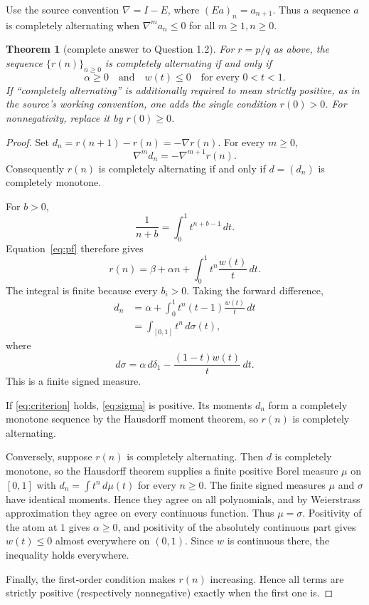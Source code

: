 \documentclass[10pt]{article}
\newtheorem{theorem}{Theorem}
\begin{document}
Use the source convention $\nabla=I-E$, where $(Ea)_n=a_{n+1}$.  Thus a
sequence $a$ is completely alternating when $\nabla^m a_n\leq0$ for all
$m\geq1,n\geq0$.

\begin{theorem}[complete answer to Question 1.2]\label{thm:main}
For $r=p/q$ as above, the sequence $\{r(n)\}_{n\geq0}$ is completely
alternating if and only if
\begin{equation}\label{eq:criterion}
                    \alpha\geq0
                    \quad\text{and}\quad
                    w(t)\leq0\quad\text{for every }0<t<1.
\end{equation}
If ``completely alternating'' is additionally required to mean strictly
positive, as in the source's working convention, one adds the single condition
$r(0)>0$.  For nonnegativity, replace it by $r(0)\geq0$.
\end{theorem}

\begin{proof}
Set $d_n=r(n+1)-r(n)=-\nabla r(n)$.  For every $m\geq0$,
\[
                         \nabla^m d_n=-\nabla^{m+1}r(n).
\]
Consequently $r(n)$ is completely alternating if and only if $d=(d_n)$ is
completely monotone.

For $b>0$,
\[
 \frac1{n+b}=\int_0^1t^{n+b-1}\,dt.
\]
Equation~\eqref{eq:pf} therefore gives
\[
 r(n)=\beta+\alpha n+\int_0^1 t^n\frac{w(t)}t\,dt.
\]
The integral is finite because every $b_i>0$.  Taking the forward difference,
\begin{align*}
 d_n
 &=\alpha+\int_0^1t^n(t-1)\frac{w(t)}t\,dt\\
 &=\int_{[0,1]}t^n\,d\sigma(t),
\end{align*}
where
\begin{equation}\label{eq:sigma}
               d\sigma=\alpha\,d\delta_1
                    -\frac{(1-t)w(t)}t\,dt.
\end{equation}
This is a finite signed measure.

If \eqref{eq:criterion} holds, \eqref{eq:sigma} is positive.  Its moments
$d_n$ form a completely monotone sequence by the Hausdorff moment theorem, so
$r(n)$ is completely alternating.

Conversely, suppose $r(n)$ is completely alternating.  Then $d$ is completely
monotone, so the Hausdorff theorem supplies a finite positive Borel measure
$\mu$ on $[0,1]$ with $d_n=\int t^n\,d\mu(t)$ for every $n\geq0$.  The finite
signed measures $\mu$ and $\sigma$ have identical moments.  Hence they agree
on all polynomials, and by Weierstrass approximation they agree on every
continuous function.  Thus $\mu=\sigma$.  Positivity of the atom at $1$ gives
$\alpha\geq0$, and positivity of the absolutely continuous part gives
$w(t)\leq0$ almost everywhere on $(0,1)$.  Since $w$ is continuous there, the
inequality holds everywhere.

Finally, the first-order condition makes $r(n)$ increasing.  Hence all terms
are strictly positive (respectively nonnegative) exactly when the first one is.
\end{proof}
\end{document}
